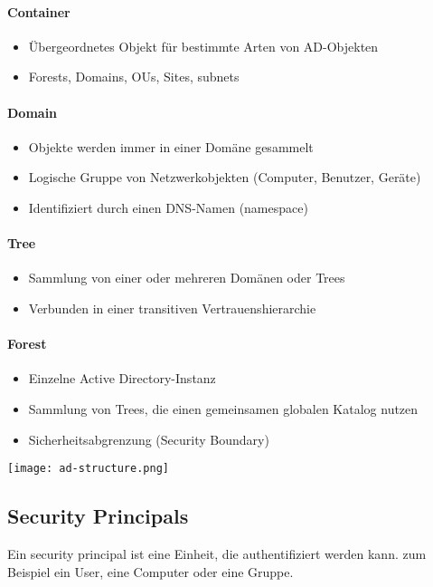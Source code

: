 \paragraph{Container}
\begin{itemize}
  \item Übergeordnetes Objekt für bestimmte Arten von AD-Objekten
  \item Forests, Domains, OUs, Sites, subnets
\end{itemize}
\paragraph{Domain}
\begin{itemize}
  \item Objekte werden immer in einer Domäne gesammelt
  \item Logische Gruppe von Netzwerkobjekten (Computer, Benutzer, Geräte)
  \item Identifiziert durch einen DNS-Namen (namespace)
\end{itemize}
\paragraph{Tree}
\begin{itemize}
  \item Sammlung von einer oder mehreren Domänen oder Trees
  \item Verbunden in einer transitiven Vertrauenshierarchie
\end{itemize}
\paragraph{Forest}
\begin{itemize}
  \item Einzelne Active Directory-Instanz
  \item Sammlung von Trees, die einen gemeinsamen globalen Katalog nutzen
  \item Sicherheitsabgrenzung (Security Boundary)
\end{itemize}

\texttt{[image: ad-structure.png]}

\subsection{Security Principals}
Ein security principal ist eine Einheit, die authentifiziert werden kann.
zum Beispiel ein User, eine Computer oder eine Gruppe.\\

